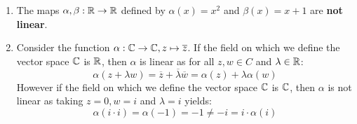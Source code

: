 \documentclass[../main.tex]{subfiles}
\begin{document}
\begin{example}
  \begin{enumerate}
    \item The maps $\alpha, \beta: \mathbb{R} \to \mathbb{R}$ defined by $\alpha(x) = x^2$ and $\beta(x) = x + 1$ are \textbf{not linear}.
    \item Consider the function $\alpha: \mathbb{C} \to \mathbb{C}, z \mapsto \overline{z}$.
      If the field on which we define the vector space $\mathbb{C}$ is $\mathbb{R}$, then $\alpha$ is linear as for all $z, w \in C$ and $\lambda \in \mathbb{R}$:
      \[
        \alpha(z + \lambda w) = \overline{z} + \overline{\lambda} \overline{w} = \alpha(z) + \lambda \alpha(w)
      \]
      However if the field on which we define the vector space $\mathbb{C}$ is $\mathbb{C}$, then $\alpha$ is not linear as taking $z = 0, w = i$ and $\lambda = i$ yields:
      \[
        \alpha(i \cdot i) = \alpha(-1) = -1 \neq -i = i \cdot \alpha(i)
      \]
  \end{enumerate}
\end{example}
\end{document}
